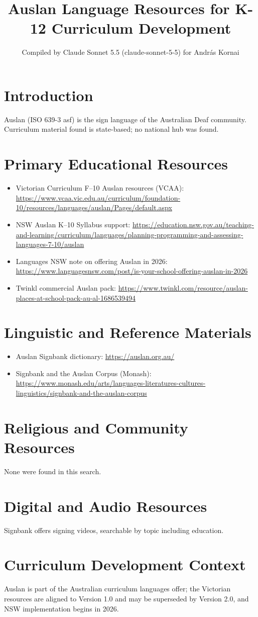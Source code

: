 \documentclass[12pt]{article}
\title{Auslan Language Resources for K-12 Curriculum Development}
\author{Compiled by Claude Sonnet 5.5 (claude-sonnet-5-5) for Andr\'as Kornai}
\date{}
\begin{document}
\maketitle
\section{Introduction}
Auslan (ISO 639-3 asf) is the sign language of the Australian Deaf community. Curriculum material found is state-based; no national hub was found.
\section{Primary Educational Resources}
\begin{itemize}
\item Victorian Curriculum F--10 Auslan resources (VCAA): \url{https://www.vcaa.vic.edu.au/curriculum/foundation-10/resources/languages/auslan/Pages/default.aspx}
\item NSW Auslan K--10 Syllabus support: \url{https://education.nsw.gov.au/teaching-and-learning/curriculum/languages/planning-programming-and-assessing-languages-7-10/auslan}
\item Languages NSW note on offering Auslan in 2026: \url{https://www.languagesnsw.com/post/is-your-school-offering-auslan-in-2026}
\item Twinkl commercial Auslan pack: \url{https://www.twinkl.com/resource/auslan-places-at-school-pack-au-al-1686539494}
\end{itemize}
\section{Linguistic and Reference Materials}
\begin{itemize}
\item Auslan Signbank dictionary: \url{https://auslan.org.au/}
\item Signbank and the Auslan Corpus (Monash): \url{https://www.monash.edu/arts/languages-literatures-cultures-linguistics/signbank-and-the-auslan-corpus}
\end{itemize}
\section{Religious and Community Resources}
None were found in this search.
\section{Digital and Audio Resources}
Signbank offers signing videos, searchable by topic including education.
\section{Curriculum Development Context}
Auslan is part of the Australian curriculum languages offer; the Victorian resources are aligned to Version 1.0 and may be superseded by Version 2.0, and NSW implementation begins in 2026.
\end{document}
